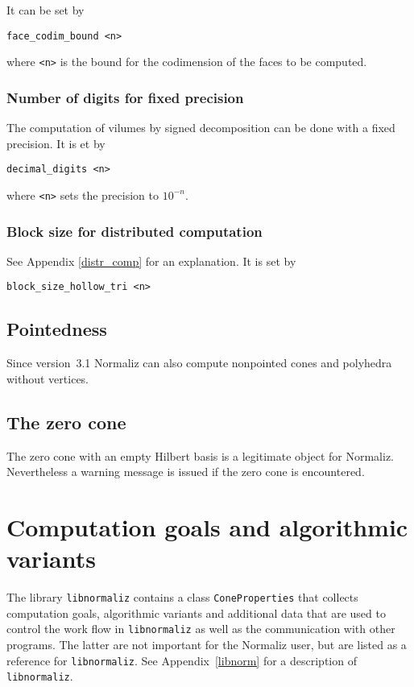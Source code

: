 \documentclass[12pt,a4paper]{scrartcl}
\theoremstyle{definition}
\begin{document}
It can be set by
\begin{Verbatim}
face_codim_bound <n>
\end{Verbatim}
where \verb|<n>| is the bound for the codimension of the faces to be computed.

\subsubsection{Number of digits for fixed precision}
The computation of vilumes by signed decomposition can be done with a fixed precision. It is et by 
\begin{Verbatim}
decimal_digits <n>
\end{Verbatim}
where \verb|<n>| sets the precision to $10^{-n}$.

\subsubsection{Block size for distributed computation}
See Appendix \ref{distr_comp} for an explanation. It is set by
\begin{Verbatim}
block_size_hollow_tri <n>
\end{Verbatim}

\subsection{Pointedness}

Since version~3.1 Normaliz can also compute nonpointed cones and polyhedra without vertices.

\subsection{The zero cone}\label{zero}
The zero cone with an empty Hilbert basis is a legitimate
object for Normaliz. Nevertheless a warning message is issued
if the zero cone is encountered.

\section{Computation goals and algorithmic variants}\label{Goals}

The library \verb|libnormaliz| contains a class \verb|ConeProperties| that collects computation goals, algorithmic variants and additional data that are used to control the work flow in \verb|libnormaliz| as well as the communication with other programs. The latter are not important for the Normaliz user, but are listed as a reference for \verb|libnormaliz|. See Appendix~\ref{libnorm} for a description of \verb|libnormaliz|.
\end{document}
